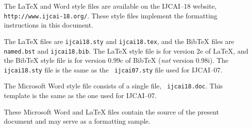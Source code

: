 \documentclass{article}
\begin{document}
The \LaTeX{} and Word style files are available on the IJCAI--18
website, {\tt http://www.ijcai-18.org/}.
These style files implement the formatting instructions in this
document.

The \LaTeX{} files are {\tt ijcai18.sty} and {\tt ijcai18.tex}, and
the Bib\TeX{} files are {\tt named.bst} and {\tt ijcai18.bib}. The
\LaTeX{} style file is for version 2e of \LaTeX{}, and the Bib\TeX{}
style file is for version 0.99c of Bib\TeX{} ({\em not} version
0.98i). The {\tt ijcai18.sty} file is the same as the {\tt
ijcai07.sty} file used for IJCAI--07.

The Microsoft Word style file consists of a single file, {\tt
ijcai18.doc}. This template is the same as the one used for
IJCAI--07.

These Microsoft Word and \LaTeX{} files contain the source of the
present document and may serve as a formatting sample.  




\end{document}
